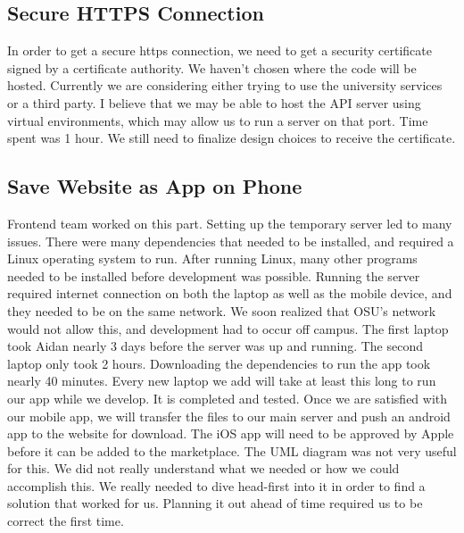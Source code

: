 \documentclass[12pt]{article}
\begin{document}
      \subsection{Secure HTTPS Connection}
      In order to get a secure https connection, we need to get a security certificate signed by a certificate authority.  We haven’t chosen where the code will be hosted.  Currently we are considering either trying to use the university services or a third party.  I believe that we may be able to host the API server using virtual environments, which may allow us to run a server on that port.  Time spent was 1 hour.  We still need to finalize design choices to receive the certificate.
      \subsection{Save Website as App on Phone}
      Frontend team worked on this part.  Setting up the temporary server led to many issues. There were many dependencies that needed to be installed, and required a Linux operating system to run. After running Linux, many other programs needed to be installed before development was possible. Running the server required internet connection on both the laptop as well as the mobile device, and they needed to be on the same network. We soon realized that OSU’s network would not allow this, and development had to occur off campus. The first laptop took Aidan nearly 3 days before the server was up and running. The second laptop only took 2 hours. Downloading the dependencies to run the app took nearly 40 minutes. Every new laptop we add will take at least this long to run our app while we develop. It is completed and tested. Once we are satisfied with our mobile app, we will transfer the files to our main server and push an android app to the website for download. The iOS app will need to be approved by Apple before it can be added to the marketplace. The UML diagram was not very useful for this. We did not really understand what we needed or how we could accomplish this. We really needed to dive head-first into it in order to find a solution that worked for us. Planning it out ahead of time required us to be correct the first time.
\end{document}
